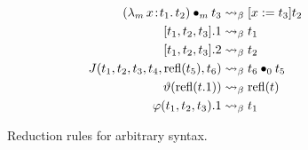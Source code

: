 
\begin{figure}
    \centering
    \begin{align*}
        ({\lambda_m}\, x\! : \! t_1.\, t_2) \bullet_{m} t_3 &\rightsquigarrow_\beta [ x := t_3]t_2 \\
        [t_1, t_2, t_3].1 &\rightsquigarrow_\beta t_1 \\
        [t_1, t_2, t_3].2 &\rightsquigarrow_\beta t_2 \\
        J(t_1, t_2, t_3, t_4, \text{refl}(t_5), t_6) &\rightsquigarrow_\beta t_6 \bullet_{0} t_5 \\
        \vartheta(\text{refl}(t.1)) &\rightsquigarrow_\beta \text{refl}(t) \\
        \varphi(t_1, t_2, t_3).1 &\rightsquigarrow_\beta t_1
    \end{align*}
    \caption{Reduction rules for arbitrary syntax.}
\end{figure}


